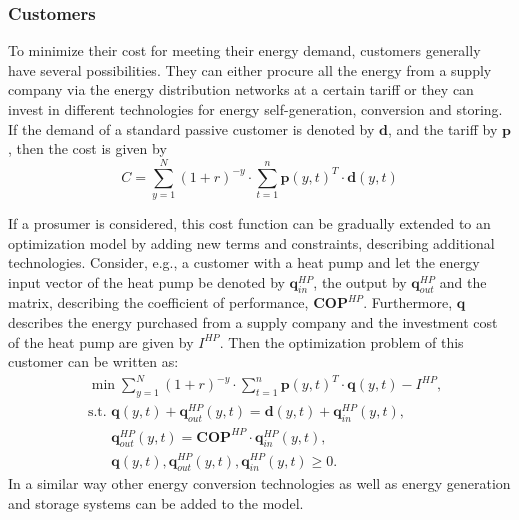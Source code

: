 \documentclass[a4paper,twoside]{article}
\begin{document}
\subsubsection{Customers}
To minimize their cost for meeting their energy demand, customers
generally have several possibilities. They can either procure all the
energy from a supply company via the energy distribution networks at a
certain tariff or they can invest in different technologies for energy
self-generation, conversion and storing.
If the demand of a standard passive customer is
denoted by $\mathbf{d}$, and the tariff by $\mathbf{p}$, then the cost is given by 
\begin{equation*}
  C = \sum_{y=1}^{N}(1+r)^{-y} \cdot \sum_{t=1}^{n} \mathbf{p}(y,t)^{T} \cdot \mathbf{d}(y,t)
\end{equation*}

If a prosumer is considered, this cost function can be gradually
extended to an optimization model by adding new terms and constraints,
describing additional technologies. Consider, e.g., a customer with a
heat pump and let the energy input vector of the heat pump be denoted
by $\mathbf{q}_{in}^{HP}$, the output by $\mathbf{q}_{out}^{HP}$ and the matrix,
describing the coefficient of performance, $\mathbf{COP}^{HP}$. Furthermore,
$\mathbf{q}$ describes the energy purchased from a supply company and the
investment cost of the heat pump are given by $I^{HP}$. Then the
optimization problem of this customer can be written as: 
\begin{align*}
  & \min \sum_{y=1}^{N}(1+r)^{-y} \cdot \sum_{t=1}^{n} \mathbf{p}(y,t)^T \cdot
  \mathbf{q}(y,t) - I^{HP}, \\
  & \textrm{s.t. } \mathbf{q}(y,t) + \mathbf{q}_{out}^{HP} (y,t)  = \mathbf{d}(y,t) +
                     \mathbf{q}_{in}^{HP} (y,t), \\
  & \phantom{\textrm{s.t. }}\mathbf{q}_{out}^{HP}(y,t) = \mathbf{COP}^{HP} \cdot \mathbf{q}_{in}^{HP} (y,t), \\
  & \phantom{\textrm{s.t. }}\mathbf{q}(y,t), \mathbf{q}_{out}^{HP}(y,t), \mathbf{q}_{in}^{HP}(y,t) \geq 0.
\end{align*} %
In a similar way other energy conversion technologies as well as
energy generation and storage systems can be added to the model. 
\end{document}
